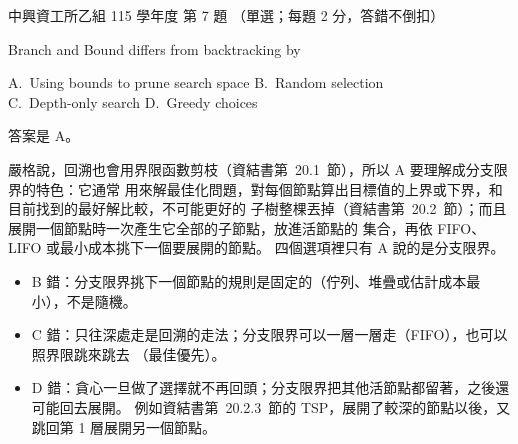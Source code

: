 \begin{pastexam}[label={px:nchu-115-is-07}]{中興資工所乙組 115 學年度 第 7 題}
（單選；每題 2 分，答錯不倒扣）

Branch and Bound differs from backtracking by

A.~Using bounds to prune search space \qquad B.~Random selection\\
C.~Depth-only search \qquad D.~Greedy choices
\end{pastexam}

\begin{pastsoln}
答案是 A。

嚴格說，回溯也會用界限函數剪枝（資結書第~20.1~節），所以 A 要理解成分支限界的特色：它通常
用來解最佳化問題，對每個節點算出目標值的上界或下界，和目前找到的最好解比較，不可能更好的
子樹整棵丟掉（資結書第~20.2~節）；而且展開一個節點時一次產生它全部的子節點，放進活節點的
集合，再依 FIFO、LIFO 或最小成本挑下一個要展開的節點。 四個選項裡只有 A 說的是分支限界。
\begin{itemize}
\item B 錯：分支限界挑下一個節點的規則是固定的（佇列、堆疊或估計成本最小），不是隨機。
\item C 錯：只往深處走是回溯的走法；分支限界可以一層一層走（FIFO），也可以照界限跳來跳去
（最佳優先）。
\item D 錯：貪心一旦做了選擇就不再回頭；分支限界把其他活節點都留著，之後還可能回去展開。
例如資結書第~20.2.3~節的 TSP，展開了較深的節點以後，又跳回第 1 層展開另一個節點。
\end{itemize}
\end{pastsoln}
